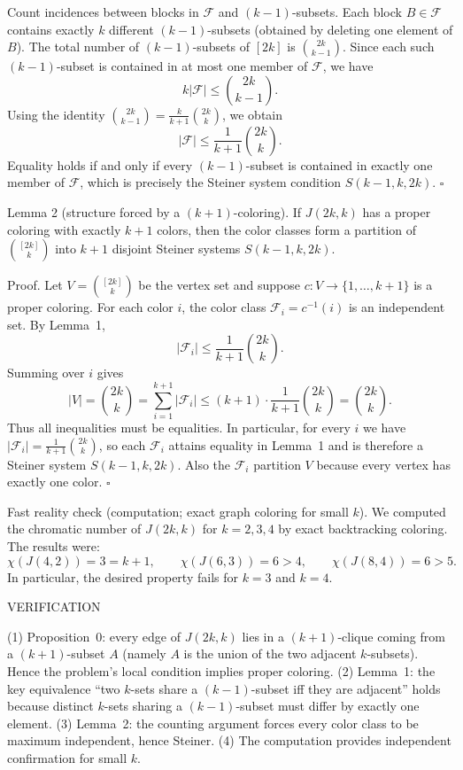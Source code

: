 Count incidences between blocks in $\mathcal{F}$ and $(k-1)$-subsets.
Each block $B\in\mathcal{F}$ contains exactly $k$ different $(k-1)$-subsets (obtained by deleting one element of $B$).
The total number of $(k-1)$-subsets of $[2k]$ is $\binom{2k}{k-1}$.
Since each such $(k-1)$-subset is contained in at most one member of $\mathcal{F}$, we have
\[
 k|\mathcal{F}|\le \binom{2k}{k-1}.
\]
Using the identity $\binom{2k}{k-1}=\frac{k}{k+1}\binom{2k}{k}$, we obtain
\[
 |\mathcal{F}|\le \frac{1}{k+1}\binom{2k}{k}.
\]
Equality holds if and only if every $(k-1)$-subset is contained in exactly one member of $\mathcal{F}$, which is precisely the Steiner system condition $S(k-1,k,2k)$.
$\square$

Lemma 2 (structure forced by a $(k+1)$-coloring).
If $J(2k,k)$ has a proper coloring with exactly $k+1$ colors, then the color classes form a partition of $\binom{[2k]}{k}$ into $k+1$ disjoint Steiner systems $S(k-1,k,2k)$.

Proof.
Let $V=\binom{[2k]}{k}$ be the vertex set and suppose $c:V\to\{1,\dots,k+1\}$ is a proper coloring.
For each color $i$, the color class $\mathcal{F}_i=c^{-1}(i)$ is an independent set.
By Lemma~1,
\[
|\mathcal{F}_i|\le \frac{1}{k+1}\binom{2k}{k}.
\]
Summing over $i$ gives
\[
|V|=\binom{2k}{k}=\sum_{i=1}^{k+1} |\mathcal{F}_i|\le (k+1)\cdot \frac{1}{k+1}\binom{2k}{k}=\binom{2k}{k}.
\]
Thus all inequalities must be equalities.
In particular, for every $i$ we have $|\mathcal{F}_i|=\frac{1}{k+1}\binom{2k}{k}$, so each $\mathcal{F}_i$ attains equality in Lemma~1 and is therefore a Steiner system $S(k-1,k,2k)$.
Also the $\mathcal{F}_i$ partition $V$ because every vertex has exactly one color.
$\square$

Fast reality check (computation; exact graph coloring for small $k$).
We computed the chromatic number of $J(2k,k)$ for $k=2,3,4$ by exact backtracking coloring.
The results were:
\[
\chi(J(4,2))=3=k+1,\qquad \chi(J(6,3))=6>4,\qquad \chi(J(8,4))=6>5.
\]
In particular, the desired property fails for $k=3$ and $k=4$.

VERIFICATION

(1) Proposition~0: every edge of $J(2k,k)$ lies in a $(k+1)$-clique coming from a $(k+1)$-subset $A$ (namely $A$ is the union of the two adjacent $k$-subsets). Hence the problem's local condition implies proper coloring.
(2) Lemma~1: the key equivalence “two $k$-sets share a $(k-1)$-subset iff they are adjacent” holds because distinct $k$-sets sharing a $(k-1)$-subset must differ by exactly one element.
(3) Lemma~2: the counting argument forces every color class to be maximum independent, hence Steiner.
(4) The computation provides independent confirmation for small $k$.

